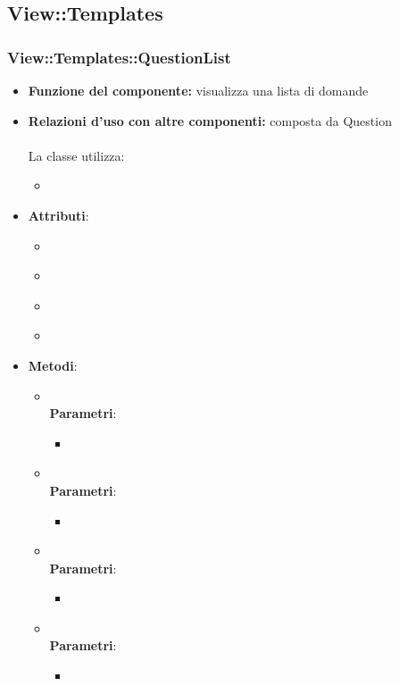 \subsection{View::Templates}
\subsubsection{View::Templates::QuestionList}
\begin{itemize}
\item\textbf{Funzione del componente:} visualizza una lista di domande
				\item\textbf{Relazioni d'uso con altre componenti:} composta da Question\\ \\
La classe utilizza:
	\begin{itemize}
		\item
	\end{itemize}
\item\textbf{Attributi}:
\begin{itemize}
		\item\code{}\\
		\item\code{}\\
		\item\code{}\\
		\item\code{}\\
	\end{itemize}
\item\textbf{Metodi}:
	\begin{itemize}
		\item\code{}\\
		\textbf{Parametri}:
			\begin{itemize}
		\item\code{}\\
			\end{itemize}
		\item\code{}\\
		\textbf{Parametri}:
			\begin{itemize}
				\item\code{}\\
		\end{itemize}
		\item\code{}\\
		\textbf{Parametri}:
			\begin{itemize}
				\item\code{}\\
			\end{itemize}
		\item\code{}\\
		\textbf{Parametri}:
			\begin{itemize}
				\item\code{}\\
			\end{itemize}
	\end{itemize}
\end{itemize}

